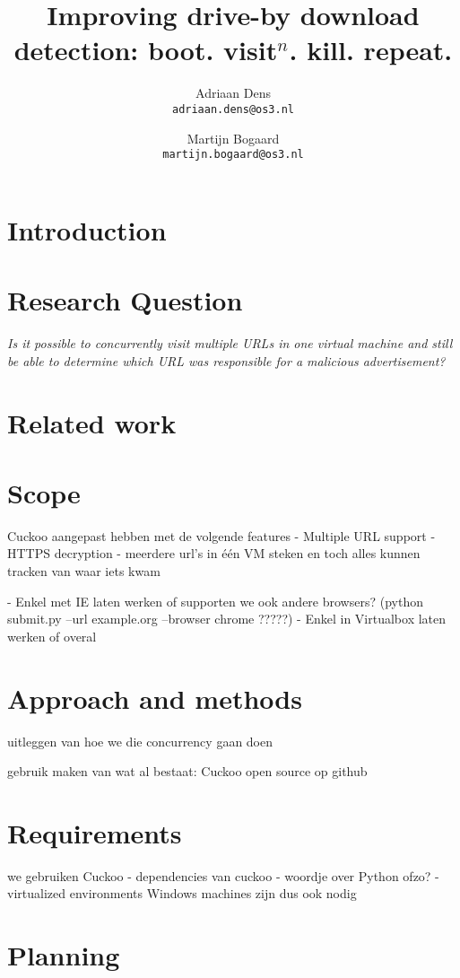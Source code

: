\documentclass{scrartcl}
\title{Improving drive-by download detection: boot. visit$^n$. kill. repeat.}
\author{
  Adriaan Dens\\
   \texttt{adriaan.dens@os3.nl}
  \and
  Martijn Bogaard\\
   \texttt{martijn.bogaard@os3.nl}
}
\begin{document}
\maketitle
\newpage

\section{Introduction}

\section{Research Question}

\textit{Is it possible to concurrently visit multiple URLs in one virtual machine and still be able to determine which URL was responsible for a malicious advertisement?}
\\
\section{Related work}
\section{Scope}

	Cuckoo aangepast hebben met de volgende features
		- Multiple URL support
		- HTTPS decryption
		- meerdere url's in één VM steken en toch alles kunnen tracken van waar iets kwam


 - Enkel met IE laten werken of supporten we ook andere browsers?
	(python submit.py --url example.org --browser chrome ?????)
 - Enkel in Virtualbox laten werken of overal


\section{Approach and methods}

uitleggen van hoe we die concurrency gaan doen

gebruik maken van wat al bestaat: Cuckoo
open source op github


\section{Requirements}

we gebruiken Cuckoo
	- dependencies van cuckoo
	- woordje over Python ofzo?
	- virtualized environments
Windows machines zijn dus ook nodig


\section{Planning}
\end{document}
